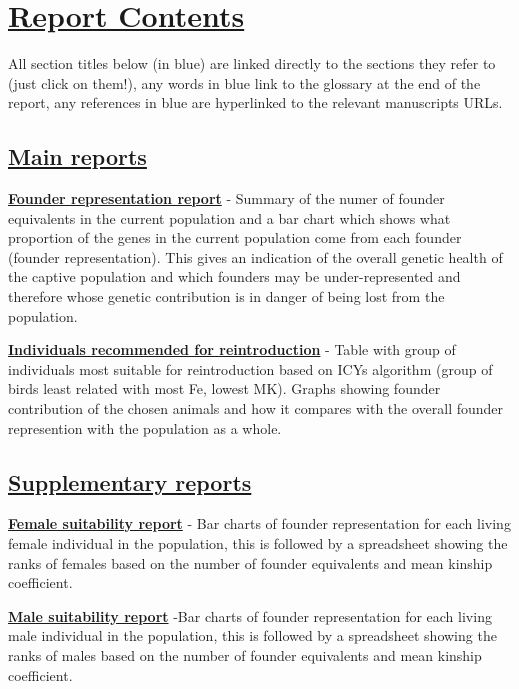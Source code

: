 \documentclass[12pt,]{article}
\begin{document}
\section{\underline{\textbf{Report Contents}}}

All section titles below (in blue) are linked directly to the sections
they refer to (just click on them!), any words in blue link to the
glossary at the end of the report, any references in blue are
hyperlinked to the relevant manuscripts URLs.

\subsection{\underline{\textbf{Main reports}}}

\hyperlink{found_contrib}{\textbf{Founder representation report}} -
Summary of the numer of founder equivalents in the current population
and a bar chart which shows what proportion of the genes in the current
population come from each founder (founder representation). This gives
an indication of the overall genetic health of the captive population
and which founders may be under-represented and therefore whose genetic
contribution is in danger of being lost from the population.

\hyperlink{best_ind}{\textbf{Individuals recommended for reintroduction}}
- Table with group of individuals most suitable for reintroduction based
on ICYs algorithm (group of birds least related with most Fe, lowest
MK). Graphs showing founder contribution of the chosen animals and how
it compares with the overall founder represention with the population as
a whole.

\subsection{\underline{\textbf{Supplementary reports}}}

\hyperlink{fem_rep}{\textbf{Female suitability report}} - Bar charts of
founder representation for each living female individual in the
population, this is followed by a spreadsheet showing the ranks of
females based on the number of founder equivalents and mean kinship
coefficient.

\hyperlink{male_rep}{\textbf{Male suitability report}} -Bar charts of
founder representation for each living male individual in the
population, this is followed by a spreadsheet showing the ranks of males
based on the number of founder equivalents and mean kinship coefficient.
\end{document}
